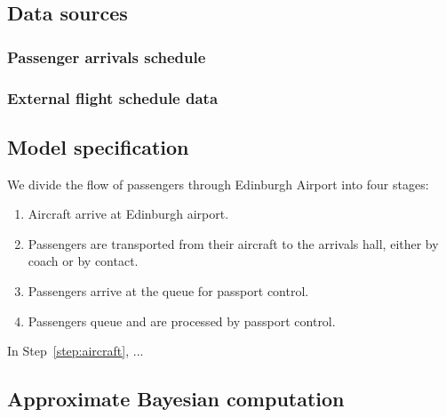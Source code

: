 \documentclass[12pt]{article}
\begin{document}

% 


\subsection{Data sources}
\subsubsection{Passenger arrivals schedule}
\subsubsection{External flight schedule data}
\subsection{Model specification}
We divide the flow of passengers through Edinburgh Airport into four stages:

\begin{enumerate}
    \item Aircraft arrive at Edinburgh airport. \label{step:aircraft}
    \item Passengers are transported from their aircraft to the arrivals hall, either by coach or by contact. \label{step:transport}
    \item Passengers arrive at the queue for passport control. \label{step:arrival}
    \item Passengers queue and are processed by passport control. \label{step:queue}
\end{enumerate}
In Step~\ref{step:aircraft}, ...
\subsection{Approximate Bayesian computation}
\end{document}
